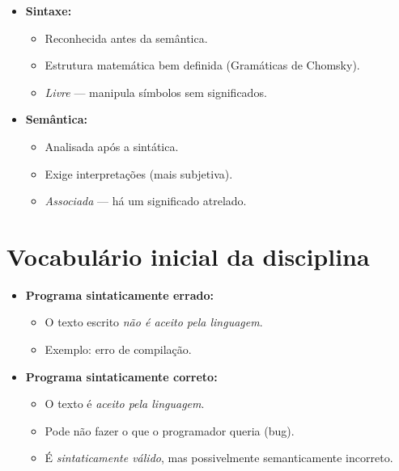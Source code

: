 \documentclass[12pt]{article}
\begin{document}
\begin{itemize}
    \item \textbf{Sintaxe:}
    \begin{itemize}
        \item Reconhecida antes da semântica.
        \item Estrutura matemática bem definida (Gramáticas de Chomsky).
        \item \textit{Livre} — manipula símbolos sem significados.
    \end{itemize}
    
    \item \textbf{Semântica:}
    \begin{itemize}
        \item Analisada após a sintática.
        \item Exige interpretações (mais subjetiva).
        \item \textit{Associada} — há um significado atrelado.
    \end{itemize}
\end{itemize}

\section*{Vocabulário inicial da disciplina}

\begin{itemize}
    \item \textbf{Programa sintaticamente errado:}
    \begin{itemize}
        \item O texto escrito \textit{não é aceito pela linguagem}.
        \item Exemplo: erro de compilação.
    \end{itemize}
    
    \item \textbf{Programa sintaticamente correto:}
    \begin{itemize}
        \item O texto é \textit{aceito pela linguagem}.
        \item Pode não fazer o que o programador queria (bug).
        \item É \textit{sintaticamente válido}, mas possivelmente semanticamente incorreto.
    \end{itemize}
\end{itemize}
\end{document}
